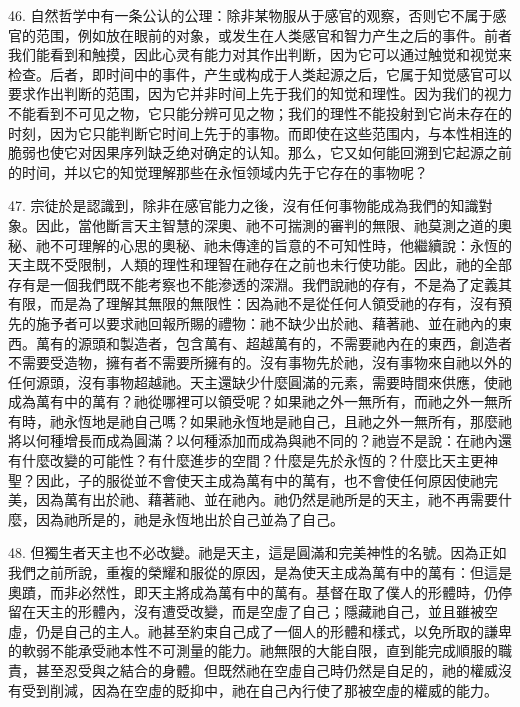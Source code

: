 46. 自然哲学中有一条公认的公理：除非某物服从于感官的观察，否则它不属于感官的范围，例如放在眼前的对象，或发生在人类感官和智力产生之后的事件。前者我们能看到和触摸，因此心灵有能力对其作出判断，因为它可以通过触觉和视觉来检查。后者，即时间中的事件，产生或构成于人类起源之后，它属于知觉感官可以要求作出判断的范围，因为它并非时间上先于我们的知觉和理性。因为我们的视力不能看到不可见之物，它只能分辨可见之物；我们的理性不能投射到它尚未存在的时刻，因为它只能判断它时间上先于的事物。而即使在这些范围内，与本性相连的脆弱也使它对因果序列缺乏绝对确定的认知。那么，它又如何能回溯到它起源之前的时间，并以它的知觉理解那些在永恒领域内先于它存在的事物呢？\par

47. 宗徒於是認識到，除非在感官能力之後，沒有任何事物能成為我們的知識對象。因此，當他斷言天主智慧的深奧、祂不可揣測的審判的無限、祂莫測之道的奧秘、祂不可理解的心思的奧秘、祂未傳達的旨意的不可知性時，他繼續說：永恆的天主既不受限制，人類的理性和理智在祂存在之前也未行使功能。因此，祂的全部存有是一個我們既不能考察也不能滲透的深淵。我們說祂的存有，不是為了定義其有限，而是為了理解其無限的無限性：因為祂不是從任何人領受祂的存有，沒有預先的施予者可以要求祂回報所賜的禮物：祂不缺少出於祂、藉著祂、並在祂內的東西。萬有的源頭和製造者，包含萬有、超越萬有的，不需要祂內在的東西，創造者不需要受造物，擁有者不需要所擁有的。沒有事物先於祂，沒有事物來自祂以外的任何源頭，沒有事物超越祂。天主還缺少什麼圓滿的元素，需要時間來供應，使祂成為萬有中的萬有？祂從哪裡可以領受呢？如果祂之外一無所有，而祂之外一無所有時，祂永恆地是祂自己嗎？如果祂永恆地是祂自己，且祂之外一無所有，那麼祂將以何種增長而成為圓滿？以何種添加而成為與祂不同的？祂豈不是說：在祂內還有什麼改變的可能性？有什麼進步的空間？什麼是先於永恆的？什麼比天主更神聖？因此，子的服從並不會使天主成為萬有中的萬有，也不會使任何原因使祂完美，因為萬有出於祂、藉著祂、並在祂內。祂仍然是祂所是的天主，祂不再需要什麼，因為祂所是的，祂是永恆地出於自己並為了自己。\par

48. 但獨生者天主也不必改變。祂是天主，這是圓滿和完美神性的名號。因為正如我們之前所說，重複的榮耀和服從的原因，是為使天主成為萬有中的萬有：但這是奧蹟，而非必然性，即天主將成為萬有中的萬有。基督在取了僕人的形體時，仍停留在天主的形體內，沒有遭受改變，而是空虛了自己；隱藏祂自己，並且雖被空虛，仍是自己的主人。祂甚至約束自己成了一個人的形體和樣式，以免所取的謙卑的軟弱不能承受祂本性不可測量的能力。祂無限的大能自限，直到能完成順服的職責，甚至忍受與之結合的身體。但既然祂在空虛自己時仍然是自足的，祂的權威沒有受到削減，因為在空虛的貶抑中，祂在自己內行使了那被空虛的權威的能力。\par

